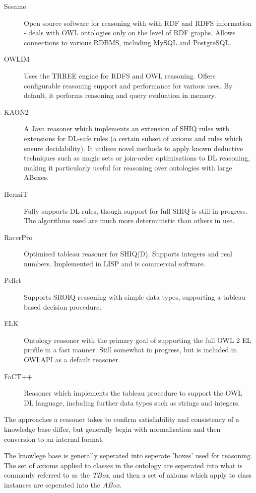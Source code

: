 \documentclass{article}
\begin{document}
\begin{description}
    \item[Sesame] Open source software for reasoning with with RDF and RDFS
    information\cite{sesame} - deals with OWL ontologies only on the level of RDF graphs.
    Allows connections to various RDBMS, including MySQL and PostgreSQL.
    \item[OWLIM] Uses the TRREE engine for RDFS and OWL reasoning. Offers
    configurable reasoning support and performance for various uses. By default,
    it performs reasoning and query evaluation in memory.\cite{owlim}
    \item[KAON2] A Java reasoner which implements an extension of SHIQ rules with
    extensions for DL-safe rules (a certain subset of axioms and rules which
    ensure decidability).\cite{kaon} It utilises novel methods to apply known
    deductive techniques such as magic sets or join-order optimisations
    to DL reasoning, making it particularly useful for reasoning over ontologies
    with large ABoxes.\cite{kaonabox}
    \item[HermiT] Fully supports DL rules, though support for full SHIQ is still
    in progress. The algorithms used are much more deterministic than others in
    use.\cite{hermit}
    \item[RacerPro] Optimised tableau reasoner for SHIQ(D). Supports integers
    and real numbers. Implemented in LISP and is commercial
    software.\cite{racerpro}
    \item[Pellet] Supports SROIQ reasoning with simple data types, supporting a
    tableau based decision procedure.\cite{pellet}
    \item[ELK] Ontology reasoner with the primary goal of supporting the full
    OWL 2 EL profile in a fast manner. Still somewhat in progress, but is included
    in OWLAPI as a default reasoner.\cite{elk}
    \item[FaCT++] Reasoner which implements the tableau procedure to support the
    OWL DL language, including further data types such as strings and
    integers.\cite{fact}
\end{description}

The approaches a reasoner takes to confirm satisfiability and consistency of
a knowledge base differ, but generally begin with normalisation and then
conversion to an internal format. 

The knowlege base is generally seperated into seperate 'boxes' used for
reasoning. The set of axioms applied to classes in the ontology are seperated
into what is commonly referred to as the \emph{TBox}, and then a set of axioms
which apply to class instances are seperated into the \emph{ABox}. 
\end{document}
